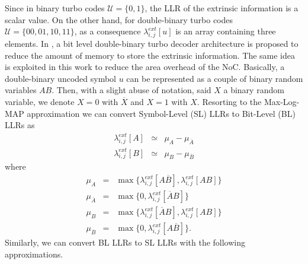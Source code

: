 \documentclass[10pt,twocolumn,journal]{IEEEtran}
\begin{document}
Since in binary turbo codes $\mathcal{U}=\{0,1\}$, the LLR of the extrinsic information is a scalar value. 
On the other hand, for double-binary turbo codes $\mathcal{U}=\{00, 01, 10, 11\}$, as a consequence  
$\lambda^{ext}_{i,j}[u]$ is an array containing three elements. In \cite{kim_TCASII09}, a bit level double-binary 
turbo decoder architecture is proposed to reduce the amount of memory to store the extrinsic information. 
The same idea is exploited in this work to reduce the area overhead of the NoC. Basically, a double-binary 
uncoded symbol $u$ can be represented as a couple of binary random variables $AB$. Then, with a slight abuse 
of notation, said $X$ a binary random variable, we denote $X=0$ with $\overline{X}$ and $X=1$ with $X$. Resorting to the Max-Log-MAP approximation we can convert Symbol-Level (SL) LLRs to Bit-Level (BL) LLRs as
\begin{eqnarray}
  \lambda^{ext}_{i,j}[A] & \simeq & \mu_{A} - \mu_{\overline{A}} \\
  \lambda^{ext}_{i,j}[B] & \simeq & \mu_{B} - \mu_{\overline{B}} 
\end{eqnarray}
where 
\begin{eqnarray}
\mu_{A} & = & \max\{\lambda^{ext}_{i,j}[A\overline{B}], \lambda^{ext}_{i,j}[AB]\} \\
\mu_{\overline{A}} & = & \max\{0, \lambda^{ext}_{i,j}[\overline{A}B] \} \\
\mu_{B} & = & \max\{\lambda^{ext}_{i,j}[\overline{A}B], \lambda^{ext}_{i,j}[AB]\} \\
\mu_{\overline{B}} & = & \max\{0, \lambda^{ext}_{i,j}[A\overline{B}] \}.
\end{eqnarray}
Similarly, we can convert BL LLRs to SL LLRs with the following approximations.
\end{document}
